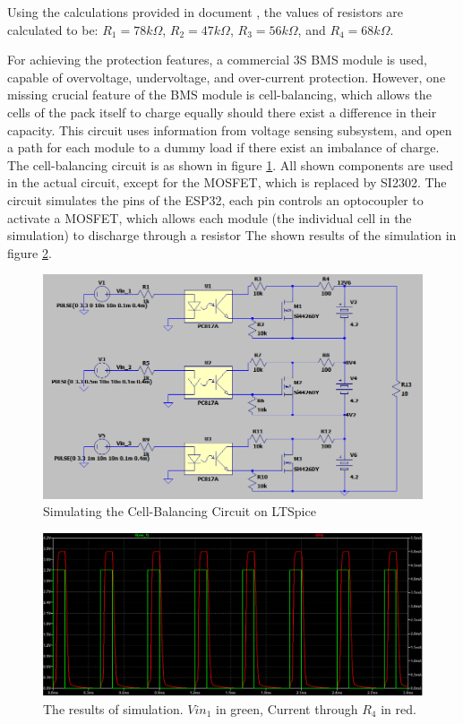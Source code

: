 Using the calculations provided in document \cite{op_amp_temperature}, the values of resistors are calculated to be: \textbf{$R_1 = 78 k\Omega$}, \textbf{$R_2 = 47 k\Omega$}, \textbf{$R_3 = 56 k\Omega$}, and \textbf{$R_4 = 68 k\Omega$}. 

For achieving the protection features, a commercial 3S BMS module is used, capable of overvoltage, undervoltage, and over-current protection. However, one missing crucial feature of the BMS module is cell-balancing, which allows the cells of the pack itself to charge equally should there exist a difference in their capacity. This circuit uses information from voltage sensing subsystem, and open a path for each module to a dummy load if there exist an imbalance of charge.
\newline The cell-balancing circuit is as shown in figure \ref{fig:hw-balance-circuit}. All shown components are used in the actual circuit, except for the MOSFET, which is replaced by SI2302. The circuit simulates the pins of the ESP32, each pin controls an optocoupler to activate a MOSFET, which allows each module (the individual cell in the simulation) to discharge through a resistor The shown results of the simulation in figure \ref{fig:hw-balance-results}.

\newpage 

\begin{figure}[h!]
    \centering
    \includegraphics[scale=0.5]{./Figures/HW/simulation-balance.png}
    \caption{Simulating the Cell-Balancing Circuit on LTSpice}
    \label{fig:hw-balance-circuit}
\end{figure}

\begin{figure}[h!]
    \centering
    \includegraphics[scale=0.35]{./Figures/HW/results-balance.png}
    \caption{The results of simulation. $Vin_1$ in green, Current through $R_4$ in red.}
    \label{fig:hw-balance-results}
\end{figure}

